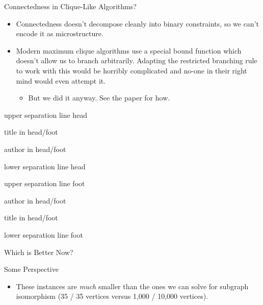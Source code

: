 \documentclass{beamer}
\makeatletter
\newenvironment{nearlyplainframe}[2][]{
    \def\beamer@entrycode{\vspace*{-\headheight}\vspace*{3pt}}
    \setbeamertemplate{headline}
    {%
        \begin{beamercolorbox}[colsep=1.5pt]{upper separation line head}
        \end{beamercolorbox}
        \begin{beamercolorbox}[ht=0.5ex,dp=0.125ex,%
            leftskip=.3cm,rightskip=.3cm plus1fil]{title in head/foot}%
        \end{beamercolorbox}%
        \begin{beamercolorbox}[ht=0.5ex,dp=0.125ex,%
            leftskip=.3cm,rightskip=.3cm plus1fil]{author in head/foot}%
        \end{beamercolorbox}%
        \begin{beamercolorbox}[colsep=1.5pt]{lower separation line head}
        \end{beamercolorbox}
        \vspace*{\headheight}
    }

    \setbeamertemplate{footline}
    {%
        \begin{beamercolorbox}[colsep=1.5pt]{upper separation line foot}
        \end{beamercolorbox}
        \begin{beamercolorbox}[ht=0.5ex,dp=0.125ex,%
            leftskip=.3cm,rightskip=.3cm plus1fil]{author in head/foot}%
        \end{beamercolorbox}%
        \begin{beamercolorbox}[ht=0.5ex,dp=0.125ex,%
            leftskip=.3cm,rightskip=.3cm plus1fil]{title in head/foot}%
        \end{beamercolorbox}%
        \begin{beamercolorbox}[colsep=1.5pt]{lower separation line foot}
        \end{beamercolorbox}
    }

    \begin{frame}[#1]{#2}
    }{
    \end{frame}
}
\makeatother
\begin{document}
\begin{frame}{Connectedness in Clique-Like Algorithms?}
    \begin{itemize}
        \item Connectedness doesn't decompose cleanly into binary constraints,
            so we can't encode it as microstructure.
        \item Modern maximum clique algorithms use a special bound function
            which doesn't allow us to branch arbitrarily. Adapting the
            restricted branching rule to work with this would be horribly
            complicated and no-one in their right mind would even attempt it.
            \begin{itemize}
                \item <2-> But we did it anyway. See the paper for how.
            \end{itemize}
    \end{itemize}
\end{frame}

\begin{nearlyplainframe}[t]{Which is Better Now?}

\end{nearlyplainframe}

\begin{frame}{Some Perspective}
    \begin{itemize}
        \item These instances are \emph{much} smaller than the ones we can solve for subgraph
            isomorphism (35 / 35 vertices versus 1,000 / 10,000 vertices).
    \end{itemize}
\end{frame}
\end{document}
